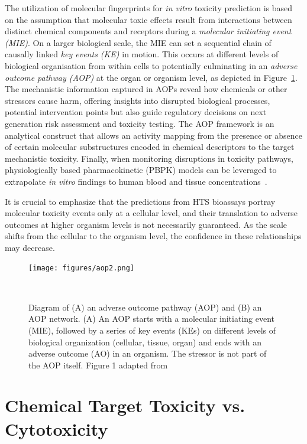 The utilization of molecular fingerprints for \emph{in vitro} toxicity prediction is based on the assumption that molecular toxic effects result from interactions between distinct chemical components and receptors during a \emph{molecular initiating event (MIE)}. On a larger biological scale, the MIE can set a sequential chain of causally linked \emph{key events (KE)} in motion. This occurs at different levels of biological organisation from within cells to potentially culminating in an \emph{adverse outcome pathway (AOP)} at the organ or organism level, as depicted in Figure~\ref{fig:aop}. The mechanistic information captured in AOPs reveal how chemicals or other stressors cause harm, offering insights into disrupted biological processes, potential intervention points but also guide regulatory decisions on next generation risk assessment and toxicity testing. The AOP framework is an analytical construct that allows an activity mapping from the presence or absence of certain molecular substructures encoded in chemical descriptors to the target mechanistic toxicity. Finally, when monitoring disruptions in toxicity pathways, physiologically based pharmacokinetic (PBPK) models can be leveraged to extrapolate \emph{in vitro} findings to human blood and tissue concentrations~\cite{bell2018}.

It is crucial to emphasize that the predictions from HTS bioassays portray molecular toxicity events only at a cellular level, and their translation to adverse outcomes at higher organism levels is not necessarily guaranteed. As the scale shifts from the cellular to the organism level, the confidence in these relationships may decrease.

\begin{figure}[htbp]  %
    \centering
    \texttt{[image: figures/aop2.png]}  
    \caption{Diagram of (A) an adverse outcome pathway (AOP) and (B) an AOP network. (A) An AOP starts with a molecular initiating event (MIE), followed by a series of key events (KEs) on different levels of biological organization (cellular, tissue, organ) and ends with an adverse outcome (AO) in an organism. The stressor is not part of the AOP itself. Figure 1 adapted from~\cite{nymark2021}}
~\label{fig:aop} 
\end{figure}


\section{Chemical Target Toxicity vs. Cytotoxicity}\label{sec:cytotoxicity}

